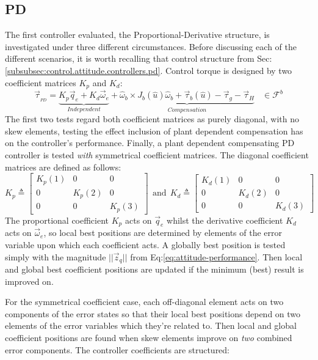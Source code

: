 \subsection{PD}
\label{subsec:simulation.attitude.pd}
The first controller evaluated, the Proportional-Derivative structure, is investigated under three different circumstances. Before discussing each of the different scenarios, it is worth recalling that control structure from Sec:\ref{subsubsec:control.attitude.controllers.pd}. Control torque is designed by two coefficient matrices $K_p$ and $K_d$:
\begin{equation}\label{eq:simulation-attitde-pd}
\vec{\tau}_{_{PD}}=\underbrace{K_p\vec{q}_e+K_d\vec{\omega}_e}_{Independent}+\underbrace{\hat{\omega}_b\times J_b(\hat{u})\hat{\omega}_b+\vec{\tau}_b(\hat{u})-\vec{\tau}_g-\vec{\tau}_H}_{Compensation}~~~~\in\mathcal{F}^{b}
\end{equation}
The first two tests regard both coefficient matrices as purely diagonal, with no skew elements, testing the effect inclusion of plant dependent compensation has on the controller's performance. Finally, a plant dependent compensating PD controller is tested \emph{with} symmetrical coefficient matrices. The diagonal coefficient matrices are defined as follows:
\begin{equation}\label{eq:simulation-attitde-pd-diagonal-coefficients}
K_p\triangleq \begin{bmatrix}
K_p(1) & 0 & 0\\
0 & K_p(2) & 0\\
0 & 0 & K_p(3)
\end{bmatrix}
~~\text{and}~~K_d\triangleq \begin{bmatrix}
K_d(1) & 0 & 0\\
0 & K_d(2) & 0\\
0 & 0 & K_d(3)
\end{bmatrix}
\end{equation}
The proportional coefficient $K_p$ acts on $\vec{q}_e$ whilst the derivative coefficient $K_d$ acts on $\vec{\omega}_e$, so local best positions are determined by elements of the error variable upon which each coefficient acts. A globally best position is tested simply with the magnitude $||\vec{z}_q||$ from Eq:\ref{eq:attitude-performance}. Then local and global best coefficient positions are updated if the minimum (best) result is improved on. 
\par
For the symmetrical coefficient case, each off-diagonal element acts on two components of the error states so that their local best positions depend on two elements of the error variables which they're related to. Then local and global coefficient positions are found when skew elements improve on \emph{two} combined error components. The  controller coefficients are structured:
